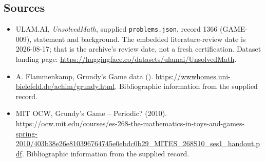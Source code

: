 \documentclass[11pt,a4paper]{article}
\begin{document}
\subsection{Sources}

{\small

\begin{itemize}

\item[\hypertarget{source:1366:1}{S1}] ULAM.AI, \emph{UnsolvedMath}, supplied \texttt{problems.json}, record 1366 (GAME-009), statement and background. The embedded literature-review date is 2026-08-17; that is the archive’s review date, not a fresh certification. Dataset landing page: \url{https://huggingface.co/datasets/ulamai/UnsolvedMath}.

\item[\hypertarget{source:1366:2}{S2}] A. Flammenkamp, Grundy's Game data (). \url{https://wwwhomes.uni-bielefeld.de/achim/grundy.html}. Bibliographic information from the supplied record.

\item[\hypertarget{source:1366:3}{S3}] MIT OCW, Grundy's Game -- Periodic? (2010). \url{https://ocw.mit.edu/courses/es-268-the-mathematics-in-toys-and-games-spring-2010/403b38e26e810396764745e0ebdc0b29_MITES_268S10_ses1_handout.pdf}. Bibliographic information from the supplied record.

\end{itemize}

}

\label{end:1366}
\end{document}
